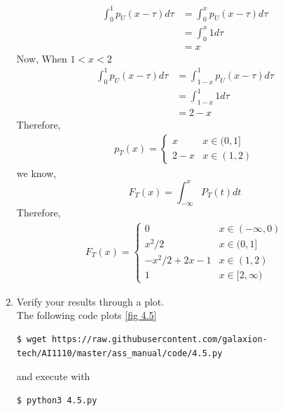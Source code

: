 \documentclass[journal,12pt,twocolumn]{IEEEtran}
\renewcommand\thesection{\arabic{section}}
\begin{document}
\begin{enumerate}[label=\thesection.\arabic*.,ref=\thesection.\theenumi]
\begin{align}
        \int_{0}^{1} p_U(x-\tau)d\tau &= \int_{0}^{x}p_U(x-\tau)d\tau \\
        &= \int_{0}^{x}1d\tau \\
        &= x
    \end{align}
    Now, When $1<x<2$ \\
    \begin{align}
        \int_{0}^{1} p_U(x-\tau)d\tau &= \int_{1-x}^{1}p_U(x-\tau)d\tau \\
        &= \int_{1-x}^{1}1d\tau \\
        &= 2-x
    \end{align}
    Therefore,
    \begin{align}
        p_T(x)=\begin{cases}
            x & x \in (0,1] \\
            2-x & x \in (1,2)
        \end{cases}
    \end{align}
    we know,
    \begin{equation}
        F_T(x) = \int_{-\infty}^{x}P_T(t)dt
       \end{equation}
    Therefore,
    \begin{align}
        F_T(x)=\begin{cases}
            0 & x \in (-\infty,0) \\
            x^2/2 & x \in (0,1] \\
            -x^2/2+2x-1 & x \in (1,2) \\
            1 & x \in [2,\infty)
        \end{cases}
    \end{align}

    \item Verify your results through a plot. \\
    \solution 
    The following code plots \ref{fig 4.5}
    \begin{lstlisting}
$ wget https://raw.githubusercontent.com/galaxion-tech/AI1110/master/ass_manual/code/4.5.py
    \end{lstlisting}
    and execute with
    \begin{lstlisting}
$ python3 4.5.py
    \end{lstlisting}


\end{enumerate}
\end{document}
